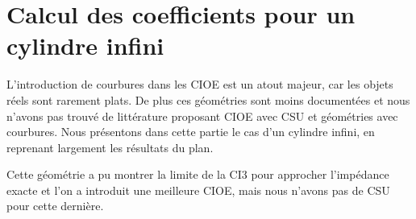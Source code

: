 \chapter{Calcul des coefficients pour un cylindre infini}
\label{sec:cylindre}
\minitoc
\newpage
{}
L'introduction de courbures dans les CIOE est un atout majeur, car les objets réels sont rarement plats. De plus ces géométries sont moins documentées et nous n'avons pas trouvé de littérature proposant CIOE avec CSU et géométries avec courbures. Nous présentons dans cette partie le cas d'un cylindre infini, en reprenant largement les résultats du plan.







Cette géométrie a pu montrer la limite de la CI3 pour approcher l'impédance exacte et l’on a introduit une meilleure CIOE, mais nous n'avons pas de CSU pour cette dernière. 
